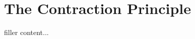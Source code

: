 \documentclass[../../templates/section]{subfiles}
\begin{document}
\section{The Contraction Principle}\label{sec:the-contraction-principle}

filler content...
\end{document}
